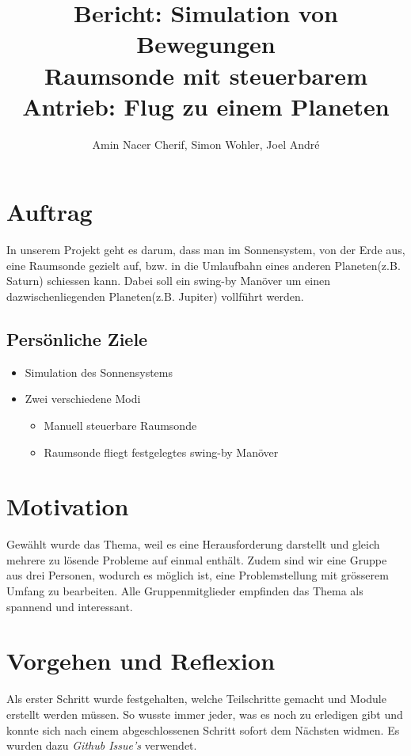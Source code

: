 \documentclass{article}
\title{
	Bericht: Simulation von Bewegungen \\
	\large Raumsonde mit steuerbarem Antrieb: Flug zu einem Planeten}
\author{Amin Nacer Cherif, Simon Wohler, Joel André}
\begin{document}
\maketitle

\section{Auftrag}
In unserem Projekt geht es darum, dass man im Sonnensystem, von der Erde aus, eine Raumsonde gezielt auf, bzw. in die Umlaufbahn eines anderen Planeten(z.B. Saturn) schiessen kann. Dabei soll ein swing-by Manöver um einen dazwischenliegenden Planeten(z.B. Jupiter) vollführt werden.

	\subsection{Persönliche Ziele}
		\begin{itemize} 
			\item Simulation des Sonnensystems
			\item Zwei verschiedene Modi
			\begin{itemize} 
				\item Manuell steuerbare Raumsonde
				\item Raumsonde fliegt festgelegtes swing-by Manöver
			\end{itemize}
		\end{itemize}

\section{Motivation}
Gewählt wurde das Thema, weil es eine Herausforderung darstellt und gleich mehrere zu lösende Probleme auf einmal enthält. Zudem sind wir eine Gruppe aus drei Personen, wodurch es möglich ist, eine Problemstellung mit grösserem Umfang zu bearbeiten. Alle Gruppenmitglieder empfinden das Thema als spannend und interessant.

\section{Vorgehen und Reflexion}
Als erster Schritt wurde festgehalten, welche Teilschritte gemacht und Module erstellt werden müssen. So wusste immer jeder, was es noch zu erledigen gibt und konnte sich nach einem abgeschlossenen Schritt sofort dem Nächsten widmen. 
Es wurden dazu \textit{Github Issue's} verwendet. 
\end{document}
